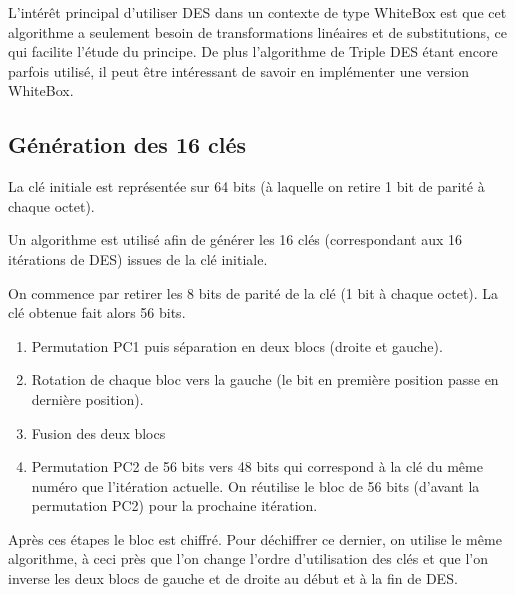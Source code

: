 \documentclass[a4paper,12pt]{article}
\begin{document}
L'intérêt principal d'utiliser DES dans un contexte de type WhiteBox est que cet algorithme a seulement besoin de transformations linéaires et de substitutions, ce qui facilite l'étude du principe. De plus l'algorithme de Triple DES étant encore parfois utilisé, il peut être intéressant de savoir en implémenter une version WhiteBox.
	
\subsection{Génération des 16 clés}	
	
La clé initiale est représentée sur 64 bits (à laquelle on retire 1 bit de parité à chaque octet). 

Un algorithme est utilisé afin de générer les 16 clés (correspondant aux 16 itérations de DES) issues de la clé initiale. 
	
On commence par retirer les 8 bits de parité de la clé (1 bit à chaque octet). La clé obtenue fait alors 56 bits.
\begin{enumerate}
\item Permutation PC1 puis séparation en deux blocs (droite et gauche).
\item Rotation de chaque bloc vers la gauche (le bit en première position passe en dernière position).
\item Fusion des deux blocs
\item Permutation PC2 de 56 bits vers 48 bits qui correspond à la clé du même numéro que l'itération actuelle. On réutilise le bloc de 56 bits (d'avant la permutation PC2) pour la prochaine itération.
\end{enumerate}

Après ces étapes le bloc est chiffré. Pour déchiffrer ce dernier, on utilise le même algorithme, à ceci près que l'on change l'ordre d'utilisation des clés et que l'on inverse les deux blocs de gauche et de droite au début et à la fin de DES.
\end{document}
